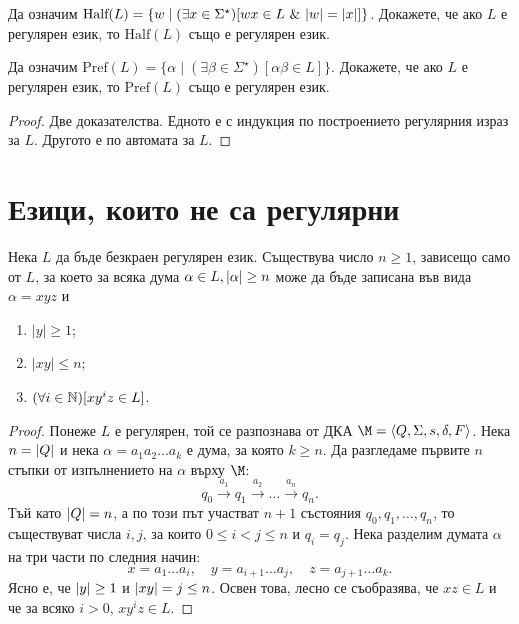 \begin{problem}
  Да означим $\mbox{Half}(L) = \{w\mid (\exists x \in \Sigma^\star)[wx \in L\ \&\ \vert{w}\vert = \vert{x}\vert]\}$.
  Докажете, че ако $L$ е регулярен език, то $\mbox{Half}(L)$ също е регулярен език.
\end{problem}

\begin{problem}
  Да означим $\mbox{Pref}(L) = \{\alpha \mid (\exists \beta \in \Sigma^\star)[\alpha\beta \in L]\}$.
  Докажете, че ако $L$ е регулярен език, то $\mbox{Pref}(L)$ също е регулярен език.
\end{problem}
\begin{proof}
  Две доказателства. Едното е с индукция по построението регулярния израз за $L$.
  Другото е по автомата за $L$.
\end{proof}

\section{Езици, които не са регулярни}
\begin{lemma}
  \label{lem:pumping-reg}
  Нека $L$ да бъде безкраен регулярен език.
  Съществува число $n\geq 1$, зависещо само от $L$, 
  за което за всяка дума $\alpha\in L, \vert{\alpha}\vert\geq n$ може да 
  бъде записана във вида $\alpha = xyz$ и 
  \begin{enumerate}[1)]
  \item
    $|y|\geq 1$;
  \item
    $|xy|\leq n$;
  \item
    $(\forall i\in\mathbb{N})[xy^iz \in L]$.
  \end{enumerate}
\end{lemma}
\begin{proof}
  Понеже $L$ е регулярен, той се разпознава от ДКА $\M = \FA$.
  Нека $n = \vert{Q}\vert$ и нека $\alpha = a_1a_2\dots a_k$ е дума, за която $k \geq n$.
  Да разгледаме първите $n$ стъпки от изпълнението на $\alpha$ върху $\M$:
  \[q_0\stackrel{a_1}{\rightarrow} q_1 \stackrel{a_2}{\rightarrow} \dots
  \stackrel{a_n}{\rightarrow} q_n.\]
  Тъй като $\vert{Q}\vert = n$, а по този път участват $n+1$ състояния $q_0,q_1,\dots,q_n$,
  то съществуват числа $i, j$, за които $0\leq i < j\leq n$ и $q_i = q_j$.
  Нека разделим думата $\alpha$ на три части по следния начин:
  \[x = a_1\dots a_i,\quad y = a_{i+1}\dots a_j,\quad z = a_{j+1}\dots a_k.\]
  Ясно е, че $\vert{y}\vert \geq 1$ и $\vert{xy}\vert = j \leq n$.
  Освен това, лесно се съобразява, че $xz \in L$ и че за всяко $i > 0$,
  $xy^iz \in L$.
\end{proof}

